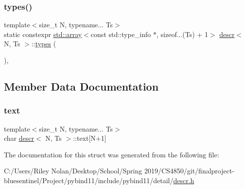 \subsubsection{\texorpdfstring{types()}{types()}}
{\footnotesize\ttfamily template$<$size\+\_\+t N, typename... Ts$>$ \\
static constexpr \mbox{\hyperlink{_s_d_l__opengl__glext_8h_a52f38e7d822a46377fde7a02708eedb1}{std\+::array}}$<$const std\+::type\+\_\+info $\ast$, sizeof...(Ts) + 1$>$ \mbox{\hyperlink{structdescr}{descr}}$<$ N, Ts $>$\+::\mbox{\hyperlink{_s_d_l__opengl__glext_8h_a4acc56c8d89f835adc106648c5d9f491}{types}} (\begin{DoxyParamCaption}{ }\end{DoxyParamCaption})\hspace{0.3cm}{\ttfamily [inline]}, {\ttfamily [static]}}



\subsection{Member Data Documentation}
\mbox{\label{structdescr_a68a25e9d18ffb4238b84b35b2757f63d}} 
\subsubsection{\texorpdfstring{text}{text}}
{\footnotesize\ttfamily template$<$size\+\_\+t N, typename... Ts$>$ \\
char \mbox{\hyperlink{structdescr}{descr}}$<$ N, Ts $>$\+::text\mbox{[}N+1\mbox{]}}



The documentation for this struct was generated from the following file\+:\begin{DoxyCompactItemize}
\item 
C\+:/\+Users/\+Riley Nolan/\+Desktop/\+School/\+Spring 2019/\+C\+S4850/git/finalproject-\/bluesentinel/\+Project/pybind11/include/pybind11/detail/\mbox{\hyperlink{descr_8h}{descr.\+h}}\end{DoxyCompactItemize}
